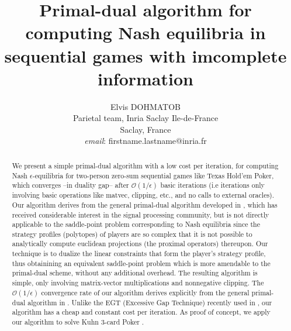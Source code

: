 \documentclass{article} %
\author{
Elvis DOHMATOB
\\
Parietal team, Inria Saclay Ile-de-France\\
Saclay, France\\
\textit{email}: firstname.lastname@inria.fr}
\title{Primal-dual algorithm for computing Nash equilibria in
sequential games with imcomplete information
}
\begin{document}
\maketitle

\begin{abstract}
We present a simple primal-dual algorithm with a low cost per iteration, for computing Nash $\epsilon$-equilibria for two-person zero-sum sequential games like Texas Hold'em Poker, which converges --in duality gap-- after $\mathcal{O}(1/\epsilon)$ basic iterations (i.e iterations only involving basic operations like matvec, clipping, etc., and no calls to external oracles). %
Our algorithm derives from the general primal-dual algorithm developed
in \cite{chambolle2010}, which has received considerable interest in the signal processing community, but is not directly applicable to the saddle-point problem corresponding to Nash equilibria since the strategy profiles (polytopes) of players are so complex that it is not possible
 to analytically compute
euclidean
 projections (the proximal operators) thereupon.
Our technique is to dualize the linear constraints that form the player's strategy profile, thus obtainining an equivalent saddle-point problem which is more amendable to the primal-dual scheme, without any additional overhead. The resulting algorithm is simple, only involving matrix-vector multiplications
and nonnegative clipping.
The $\mathcal{O}(1/\epsilon)$ convergence rate of our algorithm derives explicitly from the general primal-dual algorithm in \cite{chambolle2010}. Unlike the EGT (Excessive Gap Technique) recently used in \cite{hoda2010smoothing}, our algorithm has a cheap and constant cost per iteration. As proof of concept, we apply our algorithm to solve Kuhn 3-card Poker \cite{kuhn}.
\end{abstract}
\end{document}
